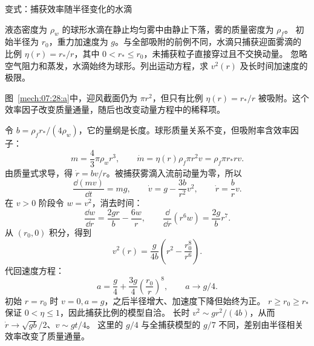 {
\begin{origexamplebox}{变式：捕获效率随半径变化的水滴}\label{ch07:ex:s09-3-28}

液态密度为 $\rho_w$ 的球形水滴在静止均匀雾中由静止下落，雾的质量密度为 $\rho_f$。
初始半径为 $r_0$，重力加速度为 $g$。与全部吸附的前例不同，水滴只捕获迎面雾滴的比例
$\eta(r)=r_*/r$，其中 $0<r_*\le r_0$，未捕获粒子直接穿过且不交换动量。
忽略空气阻力和蒸发，水滴始终为球形。列出运动方程，求 $v^2(r)$ 及长时间加速度的极限。

\begin{qualityfigure}
\label{mech:07:28:q}
\end{qualityfigure}
\end{origexamplebox}

\begin{xesolution}
\begin{qualityfigure}
\label{mech:07:28:a}
\end{qualityfigure}
图~\ref{mech:07:28:a}中，迎风截面仍为 $\pi r^2$，但只有比例 $\eta(r)=r_*/r$ 被吸附。这个效率因子改变质量通量，随后也改变动量方程中的稀释项。

令 $b=\rho_fr_*/(4\rho_w)$，它的量纲是长度。球形质量关系不变，但吸附率含效率因子：
\[
 m=\frac43\pi\rho_wr^3,\qquad
 \dot m=\eta(r)\rho_f\pi r^2v=\rho_f\pi r_*rv.
\]
由质量式求导，得 $\dot r=bv/r$。被捕获雾滴入流前动量为零，所以
\[
 \frac{\dd(mv)}{\dd t}=mg,\qquad
 \boxed{\dot v=g-\frac{3b}{r^2}v^2},\qquad
 \boxed{\dot r=\frac br v}.
\]
在 $v>0$ 阶段令 $w=v^2$，消去时间：
\[
 \frac{\dd w}{\dd r}=\frac{2gr}{b}-\frac{6w}{r},
 \qquad \frac{\dd}{\dd r}(r^6w)=\frac{2g}{b}r^7.
\]
从 $(r_0,0)$ 积分，得到
\[
 \boxed{v^2(r)=\frac{g}{4b}\left(r^2-\frac{r_0^8}{r^6}\right)}.
\]
代回速度方程：
\[
 \boxed{a=\frac g4+\frac{3g}{4}\left(\frac{r_0}{r}\right)^8},
 \qquad \boxed{a\longrightarrow g/4}.
\]
初始 $r=r_0$ 时 $v=0,a=g$，之后半径增大、加速度下降但始终为正。
$r\ge r_0\ge r_*$ 保证 $0<\eta\le1$，因此捕获比例的模型自洽。
长时 $v^2\sim gr^2/(4b)$，从而 $\dot r\to\sqrt{gb}/2$、$v\sim gt/4$。
这里的 $g/4$ 与全捕获模型的 $g/7$ 不同，差别由半径相关效率改变了质量通量。
\end{xesolution}

}
